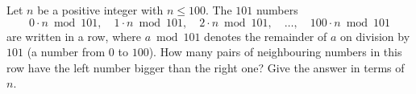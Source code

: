 Let $n$ be a positive integer with $n\le100$. The $101$ numbers
\[0\cdot n\bmod101,\quad1\cdot n\bmod101,\quad2\cdot n\bmod101,\quad\dots,\quad100\cdot n\bmod101\]
are written in a row, where $a\bmod101$ denotes the remainder of $a$ on division by $101$ (a number from $0$ to $100$). How many pairs of neighbouring numbers in this row have the left number bigger than the right one? Give the answer in terms of $n$.
